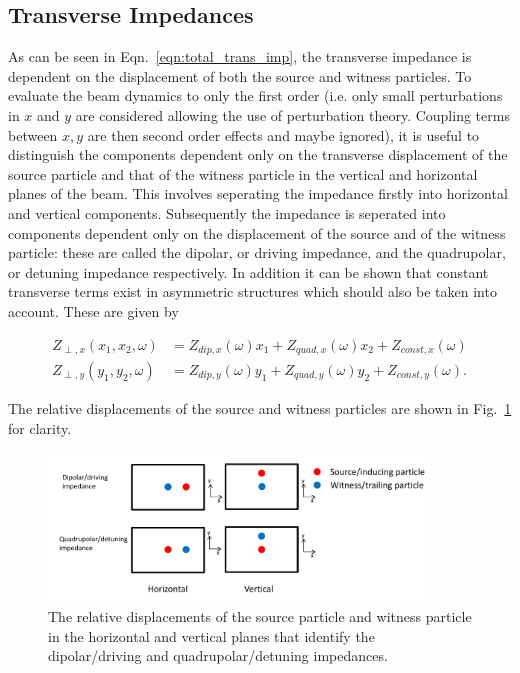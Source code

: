 \subsection{Transverse Impedances}

As can be seen in Eqn.~\ref{eqn:total_trans_imp}, the transverse impedance is dependent on the displacement of both the source and witness particles. To evaluate the beam dynamics to only the first order (i.e. only small perturbations in $x$ and $y$ are considered allowing the use of perturbation theory. Coupling terms between $x,y$ are then second order effects and maybe ignored), it is useful to distinguish the components dependent only on the transverse displacement of the source particle and that of the witness particle in the vertical and horizontal planes of the beam. This involves seperating the impedance firstly into horizontal and vertical components. Subsequently the impedance is seperated into components dependent only on the displacement of the source and of the witness particle: these are called the dipolar, or driving impedance, and the quadrupolar, or detuning impedance respectively. In addition it can be shown that constant transverse terms exist in asymmetric structures which should also be taken into account. These are given by

\begin{align}
Z_{\perp, x} \left( x_{1}, x_{2}, \omega \right) &= Z_{dip, x} \left( \omega  \right) x_{1} +  Z_{quad, x} \left( \omega   \right)x_{2} + Z_{const, x} \left( \omega  \right) \\
Z_{\perp, y} \left( y_{1}, y_{2}, \omega \right) &= Z_{dip, y} \left( \omega  \right)y_{1} +  Z_{quad, y} \left( \omega \right)y_{2} + Z_{const, y} \left( \omega  \right).
\end{align}

The relative displacements of the source and witness particles are shown in Fig.~\ref{fig:trans_imp_disp} for clarity.

\begin{figure}
\begin{center}
\includegraphics[width=0.9\textwidth]{Wakefields_and_Impedances/figures/impedance-des.pdf}
\end{center}
\caption{The relative displacements of the source particle and witness particle in the horizontal and vertical planes that identify the dipolar/driving and quadrupolar/detuning impedances.}
\label{fig:trans_imp_disp}
\end{figure}

